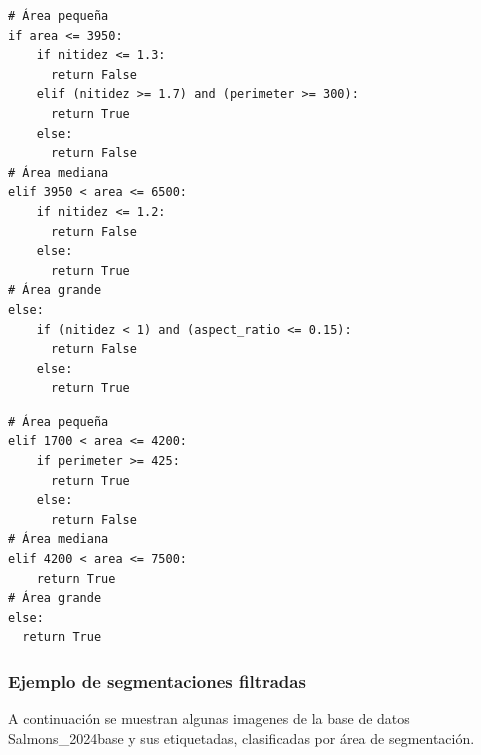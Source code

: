 \begin{listing}[htbp]
\caption[Criterio de filtrado usado en SalmonesV2]{\textit{Snippet} con el criterio de filtrado utilizado en la versión SalmonesV2.}
\label{lst:snippet_filter_salmones_v2}
\begin{verbatim}
# Área pequeña
if area <= 3950:
    if nitidez <= 1.3:
      return False
    elif (nitidez >= 1.7) and (perimeter >= 300):
      return True
    else:
      return False
# Área mediana
elif 3950 < area <= 6500:   
    if nitidez <= 1.2:
      return False
    else:
      return True
# Área grande
else:
    if (nitidez < 1) and (aspect_ratio <= 0.15):
      return False
    else:
      return True
\end{verbatim}
\end{listing}

\begin{listing}[htbp]
\caption[Criterio de filtrado usado en SalmonesV3 y SalmonesV4]{\textit{Snippet} con el criterio de filtrado utilizado en las versiones SalmonesV3 y SalmonesV4.} 
\label{lst:snippet_filter_salmones_v3_v4}
\begin{verbatim}
# Área pequeña
elif 1700 < area <= 4200:
    if perimeter >= 425:
      return True
    else:
      return False
# Área mediana
elif 4200 < area <= 7500:
    return True
# Área grande
else:
  return True
\end{verbatim}
\end{listing}

\subsubsection{Ejemplo de segmentaciones filtradas}
A continuación se muestran algunas imagenes de la base de datos Salmons_2024base y sus etiquetadas, clasificadas por área de segmentación.

